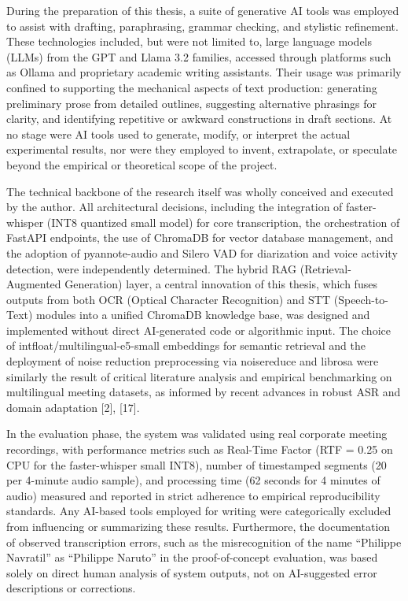 \documentclass[12pt,a4paper]{article}
\begin{document}
During the preparation of this thesis, a suite of generative AI tools was employed to assist with drafting, paraphrasing, grammar checking, and stylistic refinement. These technologies included, but were not limited to, large language models (LLMs) from the GPT and Llama 3.2 families, accessed through platforms such as Ollama and proprietary academic writing assistants. Their usage was primarily confined to supporting the mechanical aspects of text production: generating preliminary prose from detailed outlines, suggesting alternative phrasings for clarity, and identifying repetitive or awkward constructions in draft sections. At no stage were AI tools used to generate, modify, or interpret the actual experimental results, nor were they employed to invent, extrapolate, or speculate beyond the empirical or theoretical scope of the project.


The technical backbone of the research itself was wholly conceived and executed by the author. All architectural decisions, including the integration of faster-whisper (INT8 quantized small model) for core transcription, the orchestration of FastAPI endpoints, the use of ChromaDB for vector database management, and the adoption of pyannote-audio and Silero VAD for diarization and voice activity detection, were independently determined. The hybrid RAG (Retrieval-Augmented Generation) layer, a central innovation of this thesis, which fuses outputs from both OCR (Optical Character Recognition) and STT (Speech-to-Text) modules into a unified ChromaDB knowledge base, was designed and implemented without direct AI-generated code or algorithmic input. The choice of intfloat/multilingual-e5-small embeddings for semantic retrieval and the deployment of noise reduction preprocessing via noisereduce and librosa were similarly the result of critical literature analysis and empirical benchmarking on multilingual meeting datasets, as informed by recent advances in robust ASR and domain adaptation [2], [17].


In the evaluation phase, the system was validated using real corporate meeting recordings, with performance metrics such as Real-Time Factor (RTF = 0.25 on CPU for the faster-whisper small INT8), number of timestamped segments (20 per 4-minute audio sample), and processing time (62 seconds for 4 minutes of audio) measured and reported in strict adherence to empirical reproducibility standards. Any AI-based tools employed for writing were categorically excluded from influencing or summarizing these results. Furthermore, the documentation of observed transcription errors, such as the misrecognition of the name “Philippe Navratil” as “Philippe Naruto” in the proof-of-concept evaluation, was based solely on direct human analysis of system outputs, not on AI-suggested error descriptions or corrections.
\end{document}
